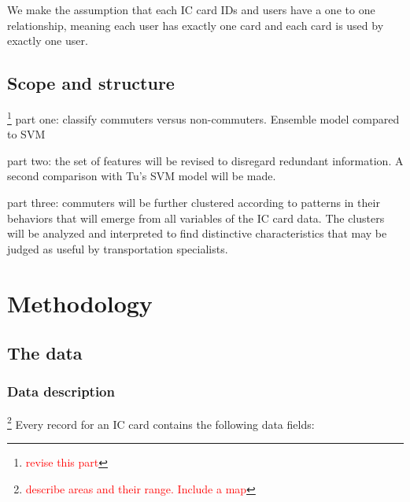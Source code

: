 \documentclass{article}
\newcommand{\selfnote}[1]{\footnote{\textcolor{red}{#1}}}
\begin{document}
We make the assumption that each IC card IDs and users have a one to one relationship, meaning each user has exactly one card and each card is used by exactly one user. 

\subsection{Scope and structure}
\selfnote{revise this part}
part one: classify commuters versus non-commuters. Ensemble model compared to SVM

part two: the set of features will be revised to disregard redundant information. A second comparison with Tu\cite{tu2016impact}'s SVM model will be made. 

part three: commuters will be further clustered according to patterns in their behaviors that will emerge from all variables of the IC card data. The clusters will be analyzed and interpreted to find distinctive characteristics that may be judged as useful by transportation specialists. 


\newpage
\section{Methodology}
\subsection{The data}
\subsubsection{Data description}
\selfnote{describe areas and their range. Include a map}
Every record for an IC card contains the following data fields:
\end{document}
